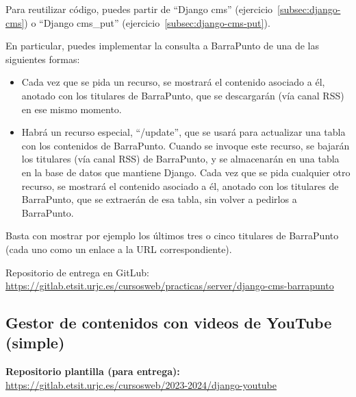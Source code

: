 
Para reutilizar código, puedes partir de ``Django cms'' (ejercicio~\ref{subsec:django-cms}) o  ``Django cms\_put'' (ejercicio~\ref{subsec:django-cms-put}).

En particular, puedes implementar la consulta a BarraPunto de una de las siguientes formas:

\begin{itemize}
\item Cada vez que se pida un recurso, se mostrará el contenido asociado a él, anotado con los titulares de BarraPunto, que se descargarán (vía canal RSS) en ese mismo momento.
\item Habrá un recurso especial, ``/update'', que se usará para actualizar una tabla con los contenidos de BarraPunto. Cuando se invoque este recurso, se bajarán los titulares (vía canal RSS) de BarraPunto, y se almacenarán en una tabla en la base de datos que mantiene Django. Cada vez que se pida cualquier otro recurso, se mostrará el contenido asociado a él, anotado con los titulares de BarraPunto, que se extraerán de esa tabla, sin volver a pedirlos a BarraPunto.
\end{itemize}

Basta con mostrar por ejemplo los últimos tres o cinco titulares de BarraPunto (cada uno como un enlace a la URL correspondiente).

Repositorio de entrega en  GitLub: \\
\url{https://gitlab.etsit.urjc.es/cursosweb/practicas/server/django-cms-barrapunto}

\subsection{Gestor de contenidos con videos de YouTube (simple)}
\label{subsec:django-cms-youtube}

\textbf{Repositorio plantilla (para entrega):} \\
\url{https://gitlab.etsit.urjc.es/cursosweb/2023-2024/django-youtube}

